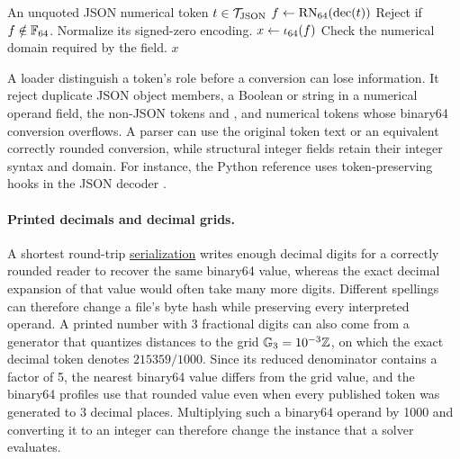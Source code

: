 \begin{algorithm}[htbp]
\caption{Read an arc or temporal operand for either exact profile}\label{alg:interpret-token}
\begin{algorithmic}[1]
\Require An unquoted JSON numerical token $t\in\mathcal{T}_{\mathrm{JSON}}$
\State $f\gets\operatorname{RN}_{64}(\operatorname{dec}(t))$
\State Reject if $f\notin\mathbb{F}_{64}$. Normalize its signed-zero encoding.
\State $x\gets\iota_{64}(f)$
\State Check the numerical domain required by the field.
\State \Return $x$
\end{algorithmic}
\end{algorithm}

A loader \must{} distinguish a token's role before a conversion can lose information. It \must{} reject duplicate JSON object members, a Boolean or string in a numerical operand field, the non-JSON tokens  and , and numerical tokens whose binary64 conversion overflows. A parser can use the original token text or an equivalent correctly rounded conversion, while structural integer fields retain their integer syntax and domain. For instance, the Python reference uses token-preserving hooks in the JSON decoder \autocite{pythonJSON2026}.

\paragraph{Printed decimals and decimal grids.}
A shortest round-trip \href{https://en.wikipedia.org/wiki/Serialization}{serialization} writes enough decimal digits for a correctly rounded reader to recover the same binary64 value, whereas the exact decimal expansion of that value would often take many more digits. Different spellings can therefore change a file's byte hash while preserving every interpreted operand. A printed number with 3 fractional digits can also come from a generator that quantizes distances to the grid $\mathbb{G}_{3}=10^{-3}\mathbb{Z}$, on which the exact decimal token  denotes $215359/1000$. Since its reduced denominator contains a factor of 5, the nearest binary64 value differs from the grid value, and the binary64 profiles use that rounded value even when every published token was generated to 3 decimal places. Multiplying such a binary64 operand by 1000 and converting it to an integer can therefore change the instance that a solver evaluates.


